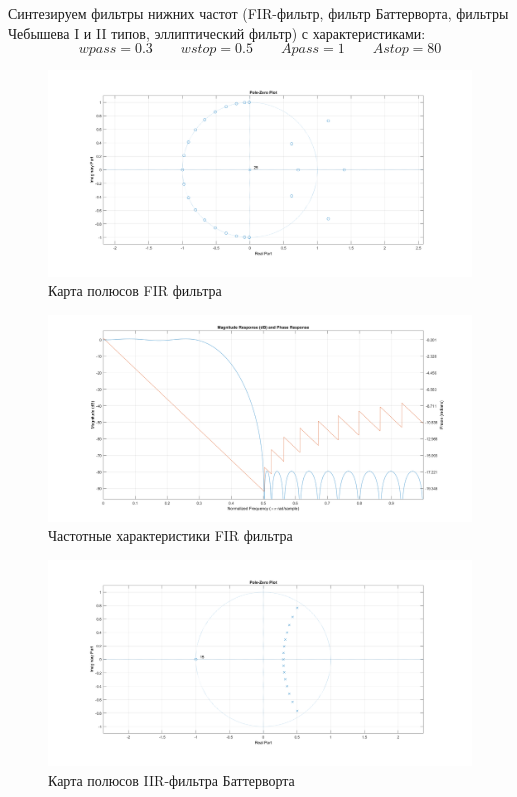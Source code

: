 \documentclass[12pt,a4paper]{article}
\begin{document}
	
	Синтезируем фильтры нижних частот (FIR-фильтр, фильтр Баттерворта, фильтры Чебышева I и II типов, эллиптический фильтр) с характеристиками:
	$$ wpass = 0.3 \qquad wstop = 0.5 \qquad Apass = 1 \qquad Astop = 80$$

	\begin{figure}[H]
		\centering
		\includegraphics[width=1.0\linewidth]{res/5_2_fir_poles.png}
		\caption{Карта полюсов FIR фильтра}
	\end{figure}
	
	\begin{figure}[H]
		\centering
		\includegraphics[width=1.0\linewidth]{res/5_2_fir_ach.png}
		\caption{Частотные характеристики FIR фильтра}
	\end{figure}

	
	\begin{figure}[H]
		\centering
		\includegraphics[width=1.0\linewidth]{res/5_2_batt_poles.png}
		\caption{Карта полюсов IIR-фильтра Баттерворта}
	\end{figure}
	
\end{document}
